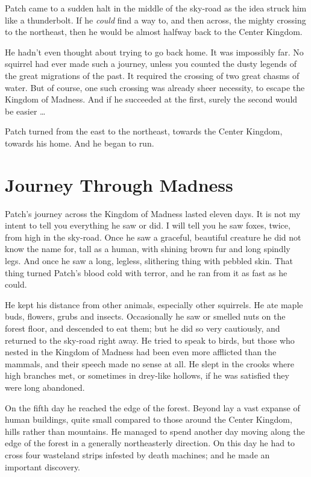 \documentclass[12pt]{memoir}
\begin{document}
Patch came to a sudden halt in the middle of the sky-road as the idea
struck him like a thunderbolt. If he \textit{could} find a way to, and
then across, the mighty crossing to the northeast, then he would be
almost halfway back to the Center Kingdom.

He hadn’t even thought about trying to go back home. It was impossibly
far. No squirrel had ever made such a journey, unless you counted the
dusty legends of the great migrations of the past. It required the
crossing of two great chasms of water. But of course, one such
crossing was already sheer necessity, to escape the Kingdom of
Madness. And if he succeeded at the first, surely the second would be
easier …

Patch turned from the east to the northeast, towards the Center
Kingdom, towards his home. And he began to run.


\section{Journey Through Madness}

Patch’s journey across the Kingdom of Madness lasted eleven days. It
is not my intent to tell you everything he saw or did. I will tell you
he saw foxes, twice, from high in the sky-road. Once he saw a
graceful, beautiful creature he did not know the name for, tall as a
human, with shining brown fur and long spindly legs. And once he saw a
long, legless, slithering thing with pebbled skin. That thing turned
Patch’s blood cold with terror, and he ran from it as fast as he
could.

He kept his distance from other animals, especially other
squirrels. He ate maple buds, flowers, grubs and insects. Occasionally
he saw or smelled nuts on the forest floor, and descended to eat them;
but he did so very cautiously, and returned to the sky-road right
away. He tried to speak to birds, but those who nested in the Kingdom
of Madness had been even more afflicted than the mammals, and their
speech made no sense at all. He slept in the crooks where high
branches met, or sometimes in drey-like hollows, if he was satisfied
they were long abandoned.

On the fifth day he reached the edge of the forest. Beyond lay a vast
expanse of human buildings, quite small compared to those around the
Center Kingdom, hills rather than mountains. He managed to spend
another day moving along the edge of the forest in a generally
northeasterly direction. On this day he had to cross four wasteland
strips infested by death machines; and he made an important discovery.
\end{document}
